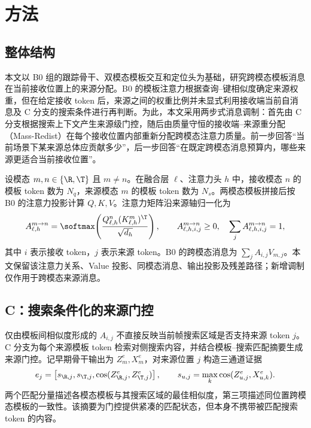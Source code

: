 \section{方法}
\subsection{整体结构}
本文以 B0 组的跟踪骨干、双模态模板交互和定位头为基础，研究跨模态模板消息在当前接收位置上的来源分配。B0 的模板注意力根据查询--键相似度确定来源权重，但在给定接收 token 后，来源之间的权重比例并未显式利用接收端当前自消息及 C 分支的搜索条件进行再判断。为此，本文采用两步式消息调制：首先由 C 分支根据搜索上下文产生来源级门控，随后由质量守恒的接收端--来源重分配（Mass-Redist）在每个接收位置内部重新分配跨模态注意力质量。前一步回答“当前场景下某来源总体应贡献多少”，后一步回答“在既定跨模态消息预算内，哪些来源更适合当前接收位置”。

设模态 $m,n\in\{\R,\T\}$ 且 $m\ne n$。在融合层 $\ell$、注意力头 $h$ 中，接收模态 $n$ 的模板 token 数为 $N_q$，来源模态 $m$ 的模板 token 数为 $N_s$。两模态模板拼接后按 B0 的注意力投影计算 $Q,K,V$。注意力矩阵沿来源轴归一化为
\begin{equation}
 A_{\ell,h}^{m\to n}
 =\softmax\!\left(\frac{Q_{\ell,h}^{n}(K_{\ell,h}^{m})^{\T}}
 {\sqrt{d_h}}\right),
 \qquad A_{\ell,h,i,j}^{m\to n}\ge 0,
 \quad \sum_j A_{\ell,h,i,j}^{m\to n}=1,
 \label{eq:b0-attn}
\end{equation}
其中 $i$ 表示接收 token，$j$ 表示来源 token。B0 的跨模态消息为 $\sum_j A_{i,j}V_{m,j}$。本文保留该注意力关系、Value 投影、同模态消息、输出投影及残差路径；新增调制仅作用于跨模态来源消息。

\subsection{C：搜索条件化的来源门控}
仅由模板间相似度形成的 $A_{i,j}$ 不直接反映当前帧搜索区域是否支持来源 token $j$。C 分支为每个来源模板 token 检索对侧搜索内容，并结合模板--搜索匹配摘要生成来源门控。记早期骨干输出为 $Z_m^e,X_m^e$，对来源位置 $j$ 构造三通道证据
\begin{equation}
 e_j=\left[s_{\R,j},s_{\T,j},
 \cos(Z_{\R,j}^e,Z_{\T,j}^e)\right],
 \qquad s_{u,j}=\max_k\cos(Z_{u,j}^e,X_{u,k}^e).
 \label{eq:mr-evidence}
\end{equation}
两个匹配分量描述各模态模板与其搜索区域的最佳相似度，第三项描述同位置跨模态模板的一致性。该摘要为门控提供紧凑的匹配状态，但本身不携带被匹配搜索 token 的内容。

